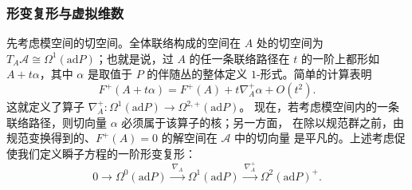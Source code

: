 \subsubsection{形变复形与虚拟维数}
\label{sec:4-3-1}

先考虑模空间的切空间。全体联络构成的空间在 $A$ 处的切空间为
$T_{A}\mathcal{A}\cong\Omega^{1}(\mathrm{ad}P)$；也就是说，过 $A$ 的任一条联络路径在
$t$ 的一阶上都形如 $A+t\alpha$，其中 $\alpha$ 是取值于 $P$ 的伴随丛的整体定义
$1$-形式。简单的计算表明
\begin{equation}
  F^{+}(A+t\alpha)=F^{+}(A)+t\nabla^{+}_{A}\alpha+O(t^{2}).
  \tag{4.22}
\end{equation}
这就定义了算子 $\nabla^{+}_{A}:\Omega^{1}(\mathrm{ad}P)\to\Omega^{2,+}(\mathrm{ad}P)$。
现在，若考虑模空间内的一条联络路径，则切向量 $\alpha$ 必须属于该算子的核；另一方面，
在除以规范群之前，由规范变换得到的、$F^{+}(A)=0$ 的解空间在 $\mathcal{A}$ 中的切向量
是平凡的。上述考虑促使我们定义瞬子方程的一阶形变复形：
\begin{equation}
  0\to\Omega^{0}(\mathrm{ad}P)
  \xrightarrow{\ \nabla_{A}\ }
  \Omega^{1}(\mathrm{ad}P)
  \xrightarrow{\ \nabla^{+}_{A}\ }
  \Omega^{2}(\mathrm{ad}P)^{+}.
  \tag{4.23}
\end{equation}


